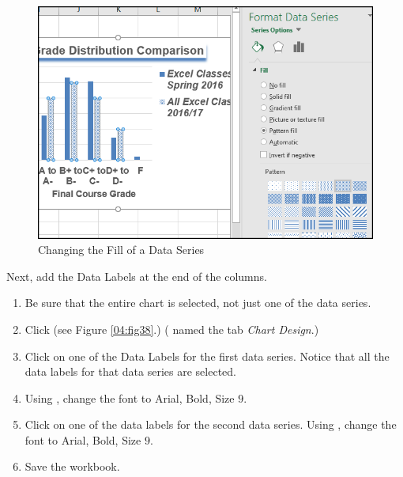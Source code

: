 \begin{figure}[H]
	\centering
	\includegraphics[width=\maxwidth{.95\linewidth}]{gfx/ch04_fig37}
	\caption{Changing the Fill of a Data Series}
	\label{04:fig37}
\end{figure}

Next, add the Data Labels at the end of the columns.

\begin{enumerate}[resume]
	\item Be sure that the entire chart is selected, not just one of the data series. 
	\item Click  (see Figure \ref{04:fig38}.) ( named the tab \textit{Chart Design}.)
	\item Click on one of the Data Labels for the first data series. Notice that all the data labels for that data series are selected.
	\item Using , change the font to Arial, Bold, Size $ 9 $.
	\item Click on one of the data labels for the second data series. Using , change the font to Arial, Bold, Size $ 9 $.
	\item Save the  workbook.
\end{enumerate}

